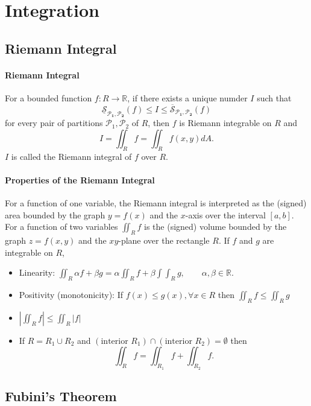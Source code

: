 
\section{Integration}

\subsection{Riemann Integral}
\paragraph{Riemann Integral}
For a bounded function \(f: R \to \mathbb R\), if there exists a unique numder \(I\) such that 
\[
    \underline{\mathcal S}_{\mathcal P_{\textbf{1}}, \mathcal P_{\textbf{2}}}(f) \leq
    I \leq
    \overline{\mathcal S}_{\mathcal P_{\textbf{1}}, \mathcal P_{\textbf{2}}}(f)
\]
for every pair of partitions \(\mathcal{P}_1, \mathcal{P}_2\) of \(R\), then \(f\) is Riemann integrable on \(R\) and
\[I = \iint_R f = \iint_R f(x, y) dA.\]
\(I\) is called the Riemann integral of \(f\) over \(R\).

\paragraph{Properties of the Riemann Integral}
For a function of one variable, the Riemann integral is interpreted as the (signed) area bounded by the graph \(y = f(x)\) and the \(x\)-axis over the interval \([a,b]\). For a function of two variables \(\iint_R f\) is the (signed) volume bounded by the graph \(z=f(x,y)\) and the \(xy\)-plane over the rectangle \(R\).
If \(f\) and \(g\) are integrable on \(R\),
\begin{itemize}
    \item Linearity: \(\iint_R \alpha f + \beta g = \alpha \iint_R f + \beta \int \int_R g, \qquad \alpha, \beta \in \mathbb R\).
    \item Positivity (monotonicity): If \(f(x)\leq g(x), \forall x\in R\) then \(\iint_R f \leq \iint_R g\)
    \item \(\left| \iint_R f \right| \leq \iint_R \left| f \right | \)
    \item If \(R = R_1 \cup R_2\) and \((\text{interior }R_1) \cap (\text{interior }R_2) = \emptyset\) then
    \[\iint_R f = \iint_{R_1} f + \iint_{R_2} f.\]
\end{itemize}

\subsection{Fubini's Theorem}

